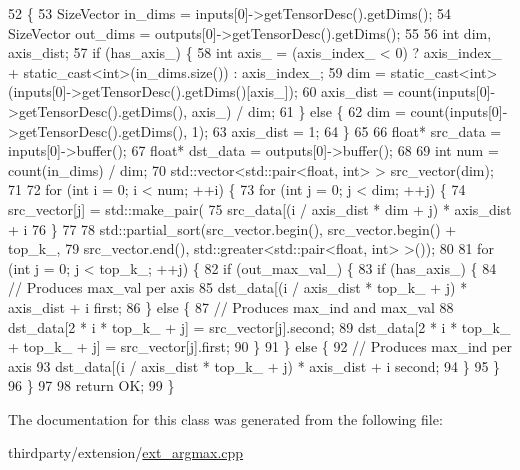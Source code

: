 \begin{DoxyCode}
52                                                              \{
53         SizeVector in\_dims = inputs[0]->getTensorDesc().getDims();
54         SizeVector out\_dims = outputs[0]->getTensorDesc().getDims();
55 
56         \textcolor{keywordtype}{int} dim, axis\_dist;
57         \textcolor{keywordflow}{if} (has\_axis\_) \{
58             \textcolor{keywordtype}{int} axis\_ = (axis\_index\_ < 0) ? axis\_index\_ + static\_cast<int>(in\_dims.size()) : axis\_index\_;
59             dim = \textcolor{keyword}{static\_cast<}\textcolor{keywordtype}{int}\textcolor{keyword}{>}(inputs[0]->getTensorDesc().getDims()[axis\_]);
60             axis\_dist = count(inputs[0]->getTensorDesc().getDims(), axis\_) / dim;
61         \} \textcolor{keywordflow}{else} \{
62             dim = count(inputs[0]->getTensorDesc().getDims(), 1);
63             axis\_dist = 1;
64         \}
65 
66         \textcolor{keywordtype}{float}* src\_data = inputs[0]->buffer();
67         \textcolor{keywordtype}{float}* dst\_data = outputs[0]->buffer();
68 
69         \textcolor{keywordtype}{int} num = count(in\_dims) / dim;
70         std::vector<std::pair<float, int> > src\_vector(dim);
71 
72         \textcolor{keywordflow}{for} (\textcolor{keywordtype}{int} i = 0; i < num; ++i) \{
73             \textcolor{keywordflow}{for} (\textcolor{keywordtype}{int} j = 0; j < dim; ++j) \{
74                 src\_vector[j] = std::make\_pair(
75                         src\_data[(i / axis\_dist * dim + j) * axis\_dist + i %
76             \}
77 
78             std::partial\_sort(src\_vector.begin(), src\_vector.begin() + top\_k\_,
79                               src\_vector.end(), std::greater<std::pair<float, int> >());
80 
81             \textcolor{keywordflow}{for} (\textcolor{keywordtype}{int} j = 0; j < top\_k\_; ++j) \{
82                 \textcolor{keywordflow}{if} (out\_max\_val\_) \{
83                     \textcolor{keywordflow}{if} (has\_axis\_) \{
84                         \textcolor{comment}{// Produces max\_val per axis}
85                         dst\_data[(i / axis\_dist * top\_k\_ + j) * axis\_dist + i %
      first;
86                     \} \textcolor{keywordflow}{else} \{
87                         \textcolor{comment}{// Produces max\_ind and max\_val}
88                         dst\_data[2 * i * top\_k\_ + j] = src\_vector[j].second;
89                         dst\_data[2 * i * top\_k\_ + top\_k\_ + j] = src\_vector[j].first;
90                     \}
91                 \} \textcolor{keywordflow}{else} \{
92                     \textcolor{comment}{// Produces max\_ind per axis}
93                     dst\_data[(i / axis\_dist * top\_k\_ + j) * axis\_dist + i %
      second;
94                 \}
95             \}
96         \}
97 
98         \textcolor{keywordflow}{return} OK;
99     \}
\end{DoxyCode}


The documentation for this class was generated from the following file\+:\begin{DoxyCompactItemize}
\item 
thirdparty/extension/\hyperlink{ext__argmax_8cpp}{ext\+\_\+argmax.\+cpp}\end{DoxyCompactItemize}
